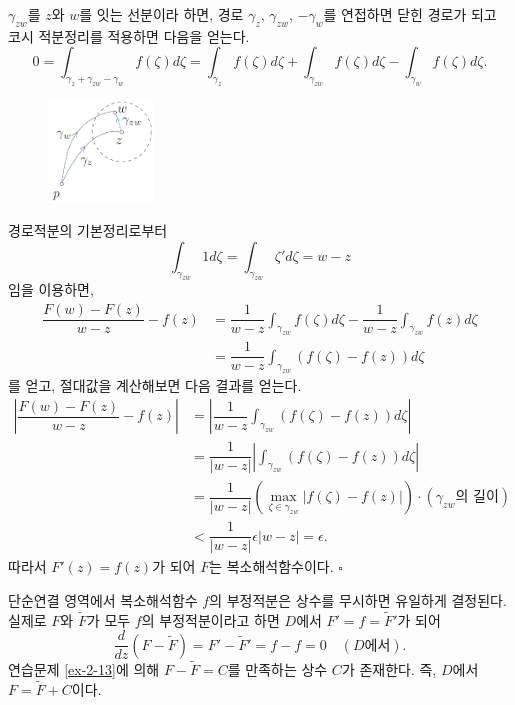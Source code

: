 $\gamma_{zw}$를 $z$와 $w$를 잇는 선분이라 하면,
경로 $\gamma_z$, $\gamma_{zw}$, $-\gamma_w$를 연접하면
닫힌 경로가 되고 코시 적분정리를 적용하면 다음을 얻는다.
\[
0 = \int_{\gamma_z  + \gamma_{zw} - \gamma_w} f(\zeta)d\zeta
= \int_{\gamma_z} f(\zeta)d\zeta + \int_{\gamma_{zw}} f(\zeta)d\zeta
- \int_{\gamma_w} f(\zeta)d\zeta.
\]
\begin{figure}[h!]
\begin{center}
\includegraphics[width=0.25\textwidth]{./SaltChapter/figs/fig-3-0-5}
\end{center}
\end{figure}

경로적분의 기본정리로부터
\[
\int_{\gamma_{zw}} 1d\zeta = \int_{\gamma_{zw}} \zeta'd\zeta = w - z
\]
임을 이용하면,
\begin{align*}
\dfrac{F(w)-F(z)}{w-z} - f(z)
&= \dfrac1{w-z} \int_{\gamma_{zw}} f(\zeta)d\zeta 
- \dfrac1{w-z} \int_{\gamma_{zw}} f(z)d\zeta \\
&= \dfrac1{w-z} \int_{\gamma_{zw}} (f(\zeta) - f(z)) d\zeta
\end{align*}
를 얻고, 절대값을 계산해보면 다음 결과를 얻는다.
\begin{align*}
\left| \dfrac{F(w)-F(z)}{w-z} - f(z) \right|
&= \left| \dfrac1{w-z} \int_{\gamma_{zw}} (f(\zeta) - f(z)) d\zeta \right| \\
&= \dfrac1{|w-z|} \left| \int_{\gamma_{zw}} (f(\zeta) - f(z)) d\zeta \right| \\
&= \dfrac1{|w-z|} \left( \max_{\zeta\in\gamma_{zw}} |f(\zeta) - f(z)| \right) \cdot
(\gamma_{zw}\text{의 길이}) \\
&< \dfrac1{|w-z|} \epsilon |w-z| = \epsilon.
\end{align*}
따라서 $F'(z) = f(z)$가 되어 $F$는 복소해석함수이다.
\hfill $\square$

\begin{salt_remark} \label{remark-3-2}
단순연결 영역에서 복소해석함수 $f$의 부정적분은 상수를 무시하면 유일하게 결정된다.
실제로 $F$와 $\tilde F$가 모두 $f$의 부정적분이라고 하면
$D$에서 $F' = f = \tilde F'$가 되어
\[
\dfrac d{dz} (F- \tilde F) = F' - \tilde F' = f - f = 0 \quad (D\text{에서}).
\]
연습문제 \ref{ex-2-13}에 의해
$F-\tilde F= C$를 만족하는 상수 $C$가 존재한다.
즉, $D$에서 $F = \tilde F + C$이다.
\end{salt_remark}

